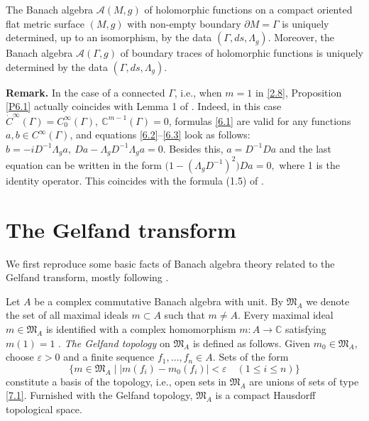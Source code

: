 \documentclass[12pt,reqno]{amsart}
\begin{document}
\begin{theorem} \label{Th6.2}
The Banach algebra ${\mathcal A}(M,g)$ of holomorphic functions on a compact oriented flat metric surface $(M,g)$ with non-empty boundary
$\partial M=\Gamma$ is uniquely determined, up to an isomorphism, by the data $(\Gamma,ds,\Lambda_g)$. Moreover, the Banach algebra ${\mathcal A}(\Gamma,g)$ of boundary traces of holomorphic functions is uniquely determined by the data $(\Gamma,ds,\Lambda_g)$.
\end{theorem}

{\bf Remark.}
In the case of a connected $\Gamma$, i.e., when $m=1$ in \eqref{2.8}, Proposition \ref{P6.1} actually coincides with Lemma 1 of \cite{Be}. Indeed, in this case $\dot C^\infty(\Gamma)=C^\infty_0(\Gamma),\ {\mathbb C}^{m-1}(\Gamma)=0$, formulas \eqref{6.1} are valid for any functions $a,b\in C^\infty(\Gamma)$, and equations \eqref{6.2}--\eqref{6.3} look as follows:
$
b=-iD^{-1}\Lambda_ga,\ Da-\Lambda_gD^{-1}\Lambda_ga=0.
$
Besides this, $a=D^{-1}Da$ and the last equation can be written in the form
$
\Big(1-(\Lambda_gD^{-1})^2\Big)Da=0,
$
where 1 is the identity operator. This coincides with the formula (1.5) of \cite{Be}.

\section{The Gelfand transform}

We first reproduce some basic facts of Banach algebra theory related to the Gelfand transform, mostly following \cite[Chaper V, Section 1]{G}.

Let $A$ be a complex commutative Banach algebra with unit. By ${\mathfrak M}_A$ we denote the set of all maximal ideals $m\subset A$ such that $m\neq A$. Every maximal ideal $m\in{\mathfrak M}_A$ is identified with a complex homomorphism $m:A\to{\mathbb C}$ satisfying $m(1)=1$ \cite[Chaper V, Theorem 1.2]{G}. {\it The Gelfand topology} on ${\mathfrak M}_A$ is defined as follows. Given $m_0\in{\mathfrak M}_A$, choose $\varepsilon>0$ and a finite sequence $f_1,\dots,f_n\in A$. Sets of the form
\begin{equation}
\{m\in{\mathfrak M}_A\mid|m(f_i)-m_0(f_i)|<\varepsilon\quad(1\le i\le n)\}
                                \label{7.1}
\end{equation}
constitute a basis of the topology, i.e., open sets in ${\mathfrak M}_A$ are unions of sets of type \eqref{7.1}. Furnished with the Gelfand topology, ${\mathfrak M}_A$ is a compact Hausdorff topological space.
\end{document}
